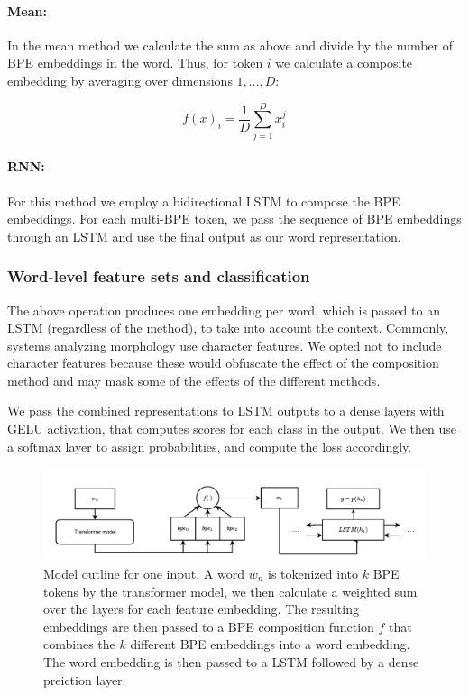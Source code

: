 \documentclass[11pt]{article}
\begin{document}
     \paragraph{Mean:} In the mean method we calculate the sum as above and
     divide by the number of BPE embeddings in the word. Thus, for
     token $i$ we calculate a composite embedding by averaging over
     dimensions $1,\ldots,D$:
	
	\begin{equation}
	f(x)_{i} = \frac{1}{D}\sum_{j=1}^{D} x_i^j
	\end{equation}
	
	
     \paragraph{RNN:} For this method we employ a bidirectional
     LSTM to compose the BPE embeddings. For each multi-BPE token, we
     pass the sequence of BPE embeddings through an LSTM and use the
     final output as our word representation.

     \subsubsection{Word-level feature sets and classification}
     The above operation produces one embedding per word, which is passed
     to an LSTM (regardless of the method), to take into account the
     context.
            Commonly, systems analyzing morphology use character
     features. We opted not to include character features because
     these would obfuscate the effect of the composition method and
     may mask some of the effects of the different methods.

            We pass the combined representations to LSTM outputs to a
     dense layers with GELU activation, that computes scores for each
     class in the output. We then use a softmax layer to assign
     probabilities, and compute the loss accordingly.

	\begin{figure}%
          \centering
	\includegraphics[scale=0.5]{single_step2.pdf}
        \caption{\label{fig:model} Model outline for one input. A word
     $w_n$ is tokenized into $k$ BPE tokens by the transformer model,
     we then calculate a weighted sum over the layers for each feature
     embedding. The resulting embeddings are then passed to a BPE
     composition function $f$ that combines the $k$ different
     BPE embeddings into a word embedding. The word embedding is then
     passed to a LSTM followed by a dense preiction layer. }
	\end{figure}
\end{document}

